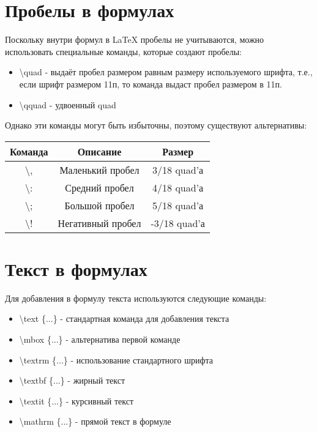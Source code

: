 \documentclass[a4paper,12pt]{article}
\begin{document}
{\section{Пробелы в формулах}
\hspace{1.25cm}Поскольку внутри формул в LaTeX пробелы не учитываются, можно использовать специальные команды, которые создают пробелы:
\begin{itemize}
    \item \textsf{\textbackslash quad} - выдаёт пробел размером равным размеру используемого шрифта, т.е., если шрифт размером 11п, то команда выдаст пробел размером в 11п.
    \item \textsf{\textbackslash qquad} - удвоенный quad
\end{itemize}
Однако эти команды могут быть избыточны, поэтому существуют альтернативы:
\begin{center}
    \begin{tabular}[h]{|c|c|c|}
    \hline
    Команда & Описание & Размер \\ \hline
    \textsf{\textbackslash ,} & Маленький пробел & 3/18 quad'а\\ \hline
    \textsf{\textbackslash :} & Средний пробел & 4/18 quad'а\\ \hline
    \textsf{\textbackslash ;} & Большой пробел & 5/18 quad'а\\ \hline
    \textsf{\textbackslash !} & Негативный пробел & -3/18 quad'а\\ \hline
    \end{tabular}
\end{center}

\section{Текст в формулах}
\hspace{1.25cm}Для добавления в формулу текста используются следующие команды:
\begin{itemize}
    \item \textsf{\textbackslash text \{...\}} - стандартная команда для добавления текста
    \item \textsf{\textbackslash mbox \{...\}} - альтернатива первой команде
    \item \textsf{\textbackslash textrm \{...\}} - использование стандартного шрифта
    \item \textsf{\textbackslash textbf \{...\}} - жирный текст
    \item \textsf{\textbackslash textit \{...\}} - курсивный текст
    \item \textsf{\textbackslash mathrm \{...\}} - прямой текст в формуле
\end{itemize}
\clearpage

}
\end{document}
